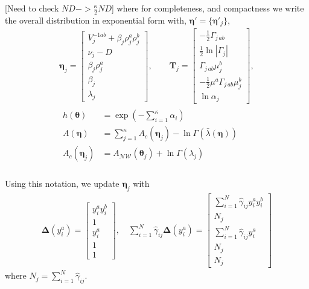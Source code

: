 \documentclass[aps,showpacs,twocolumn,prd,superscriptaddress,nofootinbib]{revtex4}
\newcommand{\nn}{\nonumber}
\begin{document}
    [Need to check $ND->\frac\kappa2ND$]
    where for completeness, and compactness we write the overall distribution in exponential form with,  $\bm\eta'=\{\bm\eta'_j\}$,
\begin{align}
  \bm\eta_j=
  \begin{bmatrix}
    V_j^{-1ab}+\beta_j\rho_j^a\rho_j^b\\[.7ex]
    \nu_j-D\\[.7ex]
    \beta_j\rho_j^a\\[.7ex]
    \beta_j\\[.7ex]
    \lambda_j
  \end{bmatrix},\qquad
\bm T_j=
\begin{bmatrix}
  -\frac12\Gamma_{j\,ab}\\[.7ex]
  \frac12\ln\left|\Gamma_j\right|\\[.7ex]
  \Gamma_{j\,ab}\mu_j^b\\[.7ex]
  -\frac12\mu^a\Gamma_{j\,ab}\mu_j^b\\[.7ex]
  \ln\alpha_j
\end{bmatrix},\nn\\
\begin{aligned}
  h(\bm \theta)&=\exp\left(-\sum_{i=1}^\kappa\alpha_i\right)\nn\\
  A(\bm\eta)&=\sum_{j=1}^\kappa A_c(\bm\eta_j)-\ln\Gamma(\bar\lambda(\bm\eta))\\
  A_c(\bm\eta_j)&=A_{\mathcal{NW}}(\bm\theta_j)+\ln \Gamma(\lambda_j)\nn\\
\end{aligned}
\end{align}

Using this notation, we update $\bm\eta_j$ with 
\begin{align}
  \bm\Delta(y_i^a)=
  \begin{bmatrix}
    y_i^ay_i^b\\[1ex]
    1\\[1ex]
    y_i^a\\[1ex]
    1\\[1ex]
    1
  \end{bmatrix},\quad
  \sum_{i=1}^N\hat\gamma_{ij}\bm \Delta(y_i^a)=
  \begin{bmatrix}
    \sum_{i=1}^N\hat\gamma_{ij}y_i^ay_i^b\\[.7ex]
    N_j\\[.7ex]
    \sum_{i=1}^N\hat\gamma_{ij}y_i^a\\[1ex]
    N_j\\[1ex]
    N_j
  \end{bmatrix}
\end{align}
where $N_j=\sum_{i=1}^N\hat\gamma_{ij}$.
\end{document}
